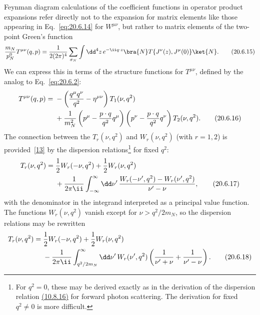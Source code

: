 Feynman diagram calculations of the coefficient functions in operator product expansions refer directly not to the expansion for matrix elements like those appearing in Eq.~\eqref{eq:20.6.14} for $W^{\mu\nu}$, but rather to matrix elements of the two-point Green's function
\begin{equation}
\frac{m_N}{p_N^0}T^{\mu\nu}(q,p)
=\frac{1}{2(2\pi)^4}\sum_{\sigma_N}
\int \dd^4z\,e^{-\ii q\cdot z}
\bra{N}T\{J^\nu(z),J^\mu(0)\}\ket{N}.
\tag{20.6.15}\label{eq:20.6.15}
\end{equation}
We can express this in terms of the structure functions for $T^{\mu\nu}$, defined by the analog to Eq.~\eqref{eq:20.6.2}:
\begin{align}
T^{\mu\nu}(q,p)
={}&-\left(\frac{q^\mu q^\nu}{q^2}-\eta^{\mu\nu}\right)
T_1(\nu,q^2)
\notag\\
&+\frac{1}{m_N^2}
\left(p^\mu-\frac{p\cdot q}{q^2}q^\mu\right)
\left(p^\nu-\frac{p\cdot q}{q^2}q^\nu\right)
T_2(\nu,q^2).
\tag{20.6.16}\label{eq:20.6.16}
\end{align}
The connection between the $T_r(\nu,q^2)$ and $W_r(\nu,q^2)$ (with $r=1,2$) is provided~\hyperref[ch20-ref-13]{[13]} by the dispersion relations\footnote{For $q^2=0$, these may be derived exactly as in the derivation of the dispersion relation \hyperref[eq:10.8.16]{(10.8.16)} for forward photon scattering. The derivation for fixed $q^2\ne0$ is more difficult.} for fixed $q^2$:
\begin{align}
T_r(\nu,q^2)
={}&\frac12W_r(-\nu,q^2)+\frac12W_r(\nu,q^2)
\notag\\
&+\frac{1}{2\pi \ii}\int_{-\infty}^{\infty}\dd\nu'\,
\frac{W_r(-\nu',q^2)-W_r(\nu',q^2)}
{\nu'-\nu},
\tag{20.6.17}\label{eq:20.6.17}
\end{align}
with the denominator in the integrand interpreted as a principal value function. The functions $W_r(\nu,q^2)$ vanish except for $\nu>q^2/2m_N$, so the dispersion relations may be rewritten
\begin{align}
T_r(\nu,q^2)
={}&\frac12W_r(-\nu,q^2)+\frac12W_r(\nu,q^2)
\notag\\
&-\frac{1}{2\pi \ii}\int_{q^2/2m_N}^{\infty}\dd\nu'\,
W_r(\nu',q^2)
\left(\frac{1}{\nu'+\nu}+\frac{1}{\nu'-\nu}\right).
\tag{20.6.18}\label{eq:20.6.18}
\end{align}


